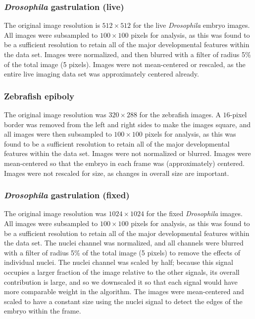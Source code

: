 \documentclass[10pt,twocolumn]{article}
\begin{document}
\subsubsection*{{\em Drosophila} gastrulation (live)}

%
The original image resolution is $512 \times 512$ for the live {\em Drosophila} embryo images.
%
All images were subsampled to $100 \times 100$ pixels for analysis, as this was found to be a sufficient resolution to retain all of the major developmental features within the data set. 
%
Images were normalized, and then blurred with a filter of radius 5\% of the total image (5 pixels). 
%
Images were not mean-centered or rescaled, as the entire live imaging data set was approximately centered already.

\subsubsection*{Zebrafish epiboly}

The original image resolution was $320 \times 288$ for the zebrafish images.
%
A $16$-pixel border was removed from the left and right sides to make the images square, and all images were then subsampled to $100 \times 100$ pixels for analysis, as this was found to be a sufficient resolution to retain all of the major developmental features within the data set. 
%
Images were not normalized or blurred.
%
Images were mean-centered so that the embryo in each frame was (approximately) centered. 
%
Images were not rescaled for size, as changes in overall size are important. 

\subsubsection*{{\em Drosophila} gastrulation (fixed)}

The original image resolution was $1024 \times 1024$ for the fixed {\em Drosophila} images.
%
All images were subsampled to $100 \times 100$ pixels for analysis, as this was found to be a sufficient resolution to retain all of the major developmental features within the data set. 
%
The nuclei channel was normalized, and all channels were blurred with a filter of radius 5\% of the total image (5 pixels) to remove the effects of individual nuclei. 
%
The nuclei channel was scaled by half; because this signal occupies a larger fraction of the image relative to the other signals, its overall contribution is large, and so we downscaled it so that each signal would have more comparable weight in the algorithm. 
%
The images were mean-centered and scaled to have a constant size using the nuclei signal to detect the edges of the embryo within the frame.
\end{document}
